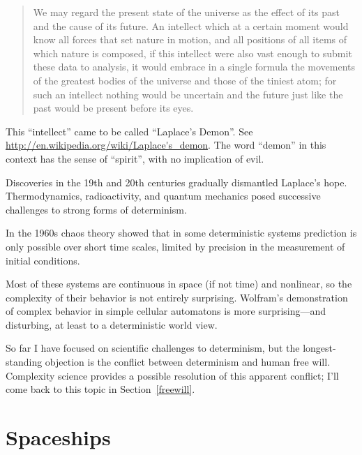 \documentclass[12pt]{book}
\theoremstyle{exercise}
\begin{document}

\begin{quote}
We may regard the present state of the universe as the effect of its
past and the cause of its future. An intellect which at a certain
moment would know all forces that set nature in motion, and all
positions of all items of which nature is composed, if this intellect
were also vast enough to submit these data to analysis, it would
embrace in a single formula the movements of the greatest bodies of
the universe and those of the tiniest atom; for such an intellect
nothing would be uncertain and the future just like the past would be
present before its eyes.
\end{quote}

This ``intellect'' came to be called ``Laplace's Demon''.
See \url{http://en.wikipedia.org/wiki/Laplace's_demon}.  The word
``demon'' in this context has the sense of ``spirit'', with no
implication of evil.


Discoveries in the 19th and 20th centuries gradually dismantled
Laplace's hope.  Thermodynamics, radioactivity,
and quantum mechanics posed successive challenges to strong
forms of determinism.


In the 1960s chaos theory showed that in some deterministic systems
prediction is only possible over short time scales,  limited by
precision in the measurement of initial conditions.

Most of these systems are continuous in space (if not time) and
nonlinear, so the complexity of their behavior is not entirely
surprising.  Wolfram's demonstration of complex behavior in simple
cellular automatons is more surprising---and disturbing, at least to a
deterministic world view.


So far I have focused on scientific challenges to determinism, but the
longest-standing objection is the conflict between
determinism and human free will.  Complexity science provides
a possible resolution of this apparent conflict; I'll come
back to this topic in Section~\ref{freewill}.



\section{Spaceships}
\label{spaceships}
\end{document}
